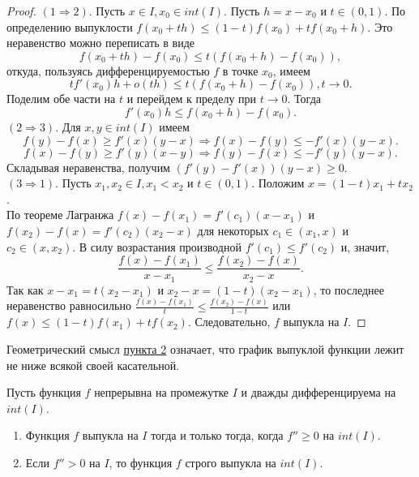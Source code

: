     \begin{proof}
        $(1 \Rightarrow 2)$. Пусть $x \in I, x_{0} \in int(I).$ Пусть $h = x - x_{0}$ и $t \in (0,1)$. По определению выпуклости $f(x_{0} + th) \leq (1-t)f(x_{0}) + tf(x_{0} + h)$. Это неравенство можно переписать в виде
        \[f(x_{0} + th) - f(x_{0}) \leq t(f(x_{0} + h) - f(x_{0})),\]
        откуда, пользуясь дифференцируемостью $f$ в точке $x_{0}$, имеем
        \[tf'(x_{0})h + o(th) \leq t(f(x_{0} + h) - f(x_{0})), t \to 0.\]
        Поделим обе части на $t$ и перейдем к пределу при $t \to 0$. Тогда 
        \[f'(x_{0})h \leq f(x_{0} + h) - f(x_{0}).\]
        $(2 \Rightarrow 3)$. Для $x,y \in int(I)$ имеем
        \[f(y) - f(x) \geq f'(x)(y-x) \Rightarrow f(x) - f(y) \leq -f'(x)(y-x).\]
        \[f(x) - f(y) \geq f'(y)(x-y) \Rightarrow f(y) - f(x) \leq -f'(y)(y-x).\]
        Складывая неравенства, получим $(f'(y) - f'(x))(y-x) \geq 0$.\\
        $(3 \Rightarrow 1)$. Пусть $x_{1}, x_{2} \in I, x_{1} < x_{2}$ и $t \in (0,1)$. Положим $x = (1-t)x_{1} + tx_{2}$.\\
        По теореме Лагранжа $f(x) - f(x_{1}) = f'(c_{1})(x-x_{1})$ и $f(x_{2}) - f(x) = f'(c_{2})(x_{2} - x)$ для некоторых $c_{1} \in (x_{1}, x)$ и $c_{2} \in (x, x_{2})$. В силу возрастания производной $f'(c_{1}) \leq f'(c_{2})$ и, значит,
        \[\frac{f(x) - f(x_{1})}{x - x_{1}} \leq \frac{f(x_{2}) - f(x)}{x_{2} - x}.\]
        Так как $x - x_{1} = t(x_{2} - x_{1})$ и $x_{2} - x = (1-t)(x_{2} - x_{1})$, то последнее неравенство равносильно $\frac{f(x) - f(x_{1})}{t} \leq \frac{f(x_{2}) - f(x)}{1 - t}$ или $f(x) \leq (1-t)f(x_{1}) + tf(x_{2})$. Следовательно, $f$ выпукла на $I$.
    \end{proof}
    
    \begin{note}
        Геометрический смысл \hyperlink{sec_punkt}{пункта 2} означает, что график выпуклой функции лежит не ниже всякой своей касательной.
    \end{note}
    
    \begin{corollary}
        Пусть функция $f$ непрерывна на промежутке $I$ и дважды дифференцируема на $int(I)$.
        \begin{enumerate}
            \item Функция $f$ выпукла на $I$ тогда и только тогда, когда $f'' \geq 0$ на $int(I)$.
            \item Если $f'' > 0$ на $I$, то функция $f$ строго выпукла на $int(I)$.
        \end{enumerate}
    \end{corollary}
    
